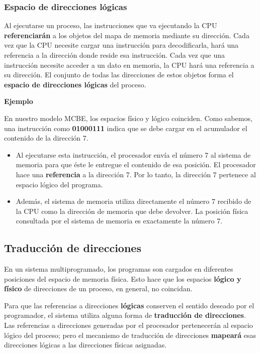 \documentclass[spanish,A4,]{article}
\begin{document}
\subsubsection{Espacio de direcciones
lógicas}\label{espacio-de-direcciones-luxf3gicas}

Al ejecutarse un proceso, las instrucciones que va ejecutando la CPU
\textbf{referenciarán} a los objetos del mapa de memoria mediante su
dirección. Cada vez que la CPU necesite cargar una instrucción para
decodificarla, hará una referencia a la dirección donde reside esa
instrucción. Cada vez que una instrucción necesite acceder a un dato en
memoria, la CPU hará una referencia a su dirección. El conjunto de todas
las direcciones de estos objetos forma el \textbf{espacio de direcciones
lógicas} del proceso.

\textbf{Ejemplo}

En nuestro modelo MCBE, los espacios físico y lógico coinciden. Como
sabemos, una instrucción como \textbf{01000111} indica que se debe
cargar en el acumulador el contenido de la dirección 7.

\begin{itemize}
\itemsep1pt\parskip0pt
\item
  Al ejecutarse esta instrucción, el procesador envía el número 7 al
  sistema de memoria para que éste le entregue el contenido de esa
  posición. El procesador hace una \textbf{referencia} a la dirección 7.
  Por lo tanto, la dirección 7 pertenece al espacio lógico del programa.
\item
  Además, el sistema de memoria utiliza directamente el número 7
  recibido de la CPU como la dirección de memoria que debe devolver. La
  posición física consultada por el sistema de memoria es exactamente la
  número 7.
\end{itemize}

\subsection{Traducción de
direcciones}\label{traducciuxf3n-de-direcciones}

En un sistema multiprogramado, los programas son cargados en diferentes
posiciones del espacio de memoria física. Esto hace que los espacios
\textbf{lógico y físico} de direcciones de un proceso, en general, no
coincidan.

Para que las referencias a direcciones \textbf{lógicas} conserven el
sentido deseado por el programador, el sistema utiliza alguna forma de
\textbf{traducción de direcciones}. Las referencias a direcciones
generadas por el procesador pertenecerán al espacio lógico del proceso;
pero el mecanismo de traducción de direcciones \textbf{mapeará} esas
direcciones lógicas a las direcciones físicas asignadas.
\end{document}
